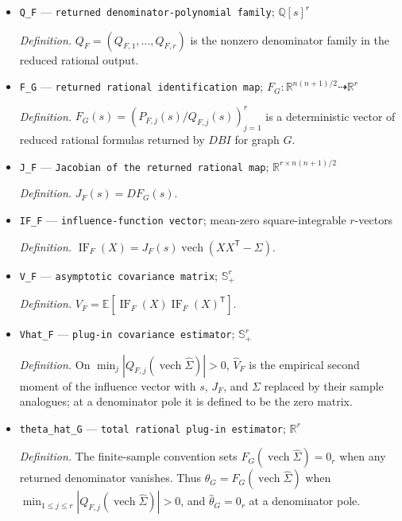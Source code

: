 \documentclass{article}
\begin{document}
\begin{itemize}
  \item \texttt{Q\_\allowbreak{}F} --- \texttt{returned denominator-\allowbreak{}polynomial family}; \(\mathbb Q[s]^r\)
  \par\smallskip\noindent\emph{Definition.} \(Q_F=(Q_{F,1},\ldots,Q_{F,r})\) is the nonzero denominator family in the reduced rational output.
  \item \texttt{F\_\allowbreak{}G} --- \texttt{returned rational identification map}; \(F_G:\mathbb R^{n(n+1)/2}\dashrightarrow\mathbb R^r\)
  \par\smallskip\noindent\emph{Definition.} \(F_G(s)=(P_{F,j}(s)/Q_{F,j}(s))_{j=1}^r\) is a deterministic vector of reduced rational formulas returned by \(DBI\) for graph \(G\).
  \item \texttt{J\_\allowbreak{}F} --- \texttt{Jacobian of the returned rational map}; \(\mathbb R^{r\times n(n+1)/2}\)
  \par\smallskip\noindent\emph{Definition.} \(J_F(s)=D F_G(s)\).
  \item \texttt{IF\_\allowbreak{}F} --- \texttt{influence-\allowbreak{}function vector}; mean-zero square-integrable \(r\)-vectors
  \par\smallskip\noindent\emph{Definition.} \(\operatorname{IF}_F(X)=J_F(s)\operatorname{vech}(XX^{\mathsf T}-\Sigma)\).
  \item \texttt{V\_\allowbreak{}F} --- \texttt{asymptotic covariance matrix}; \(\mathbb S_+^r\)
  \par\smallskip\noindent\emph{Definition.} \(V_F=\mathbb E[\operatorname{IF}_F(X)\operatorname{IF}_F(X)^{\mathsf T}]\).
  \item \texttt{Vhat\_\allowbreak{}F} --- \texttt{plug-\allowbreak{}in covariance estimator}; \(\mathbb S_+^r\)
  \par\smallskip\noindent\emph{Definition.} On \(\min_j|Q_{F,j}(\operatorname{vech}\widehat\Sigma)|>0\), \(\widehat V_F\) is the empirical second moment of the influence vector with \(s\), \(J_F\), and \(\Sigma\) replaced by their sample analogues; at a denominator pole it is defined to be the zero matrix.
  \item \texttt{theta\_\allowbreak{}hat\_\allowbreak{}G} --- \texttt{total rational plug-\allowbreak{}in estimator}; \(\mathbb R^r\)
  \par\smallskip\noindent\emph{Definition.} The finite-sample convention sets \(F_G(\operatorname{vech}\widehat\Sigma)=0_r\) when any returned denominator vanishes. Thus \(\widehat\theta_G=F_G(\operatorname{vech}\widehat\Sigma)\) when \(\min_{1\le j\le r}|Q_{F,j}(\operatorname{vech}\widehat\Sigma)|>0\), and \(\widehat\theta_G=0_r\) at a denominator pole.

\end{itemize}
\end{document}
